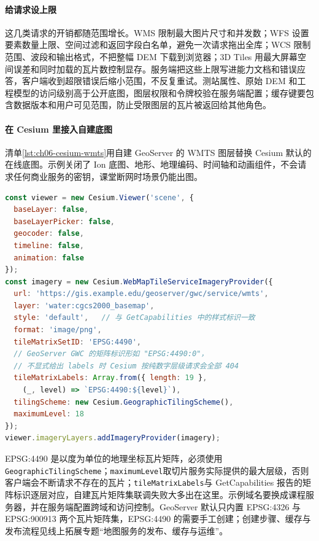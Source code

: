 \paragraph{给请求设上限}这几类请求的开销都随范围增长。WMS 限制最大图片尺寸和并发数；WFS 设置要素数量上限、空间过滤和返回字段白名单，避免一次请求拖出全库；WCS 限制范围、波段和输出格式，不把整幅 DEM 下载到浏览器；3D Tiles 用最大屏幕空间误差和同时加载的瓦片数控制显存。服务端把这些上限写进能力文档和错误应答，客户端收到超限错误后缩小范围，不反复重试。测站属性、原始 DEM 和工程模型的访问级别高于公开底图，图层权限和令牌校验在服务端配置；缓存键要包含数据版本和用户可见范围，防止受限图层的瓦片被返回给其他角色。

\paragraph{在 Cesium 里接入自建底图}清单\ref{lst:ch06-cesium-wmts}用自建 GeoServer 的 WMTS 图层替换 Cesium 默认的在线底图。示例关闭了 Ion 底图、地形、地理编码、时间轴和动画组件，不会请求任何商业服务的密钥，课堂断网时场景仍能出图。

\begin{lstlisting}[label={lst:ch06-cesium-wmts},language=JavaScript,breaklines=true,caption={Cesium 无商业底图密钥的 WMTS 初始化}]
const viewer = new Cesium.Viewer('scene', {
  baseLayer: false,
  baseLayerPicker: false,
  geocoder: false,
  timeline: false,
  animation: false
});
const imagery = new Cesium.WebMapTileServiceImageryProvider({
  url: 'https://gis.example.edu/geoserver/gwc/service/wmts',
  layer: 'water:cgcs2000_basemap',
  style: 'default',   // 与 GetCapabilities 中的样式标识一致
  format: 'image/png',
  tileMatrixSetID: 'EPSG:4490',
  // GeoServer GWC 的矩阵标识形如 "EPSG:4490:0"，
  // 不显式给出 labels 时 Cesium 按纯数字层级请求会全部 404
  tileMatrixLabels: Array.from({ length: 19 },
    (_, level) => `EPSG:4490:${level}`),
  tilingScheme: new Cesium.GeographicTilingScheme(),
  maximumLevel: 18
});
viewer.imageryLayers.addImageryProvider(imagery);
\end{lstlisting}

EPSG:4490 是以度为单位的地理坐标瓦片矩阵，必须使用\texttt{GeographicTilingScheme}；\texttt{maximumLevel}取切片服务实际提供的最大层级，否则客户端会不断请求不存在的瓦片；\texttt{tileMatrixLabels}与 GetCapabilities 报告的矩阵标识逐层对应，自建瓦片矩阵集联调失败大多出在这里。示例域名要换成课程服务器，并在服务端配置跨域和访问控制。GeoServer 默认只内置 EPSG:4326 与 EPSG:900913 两个瓦片矩阵集，EPSG:4490 的需要手工创建；创建步骤、缓存与发布流程见线上拓展专题“地图服务的发布、缓存与运维”。

